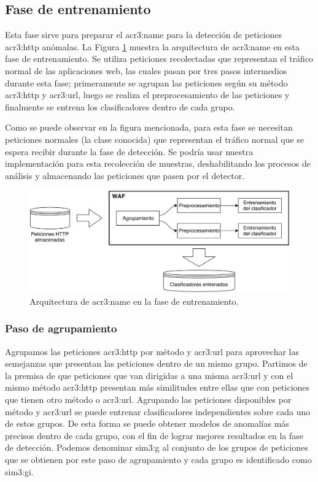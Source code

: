 \subsection{Fase de entrenamiento}

Esta fase sirve para preparar el \gls{acr3:name} para la detección de
peticiones \gls{acr3:http} anómalas. La Figura \ref{fig:waf:waf_diagram_training}
muestra la arquitectura de \gls{acr3:name} en esta fase de entrenamiento.
Se utiliza peticiones recolectadas que representan el tráfico normal de
las aplicaciones web, las cuales pasan por tres pasos intermedios durante
esta fase; primeramente se agrupan las peticiones según su método
\gls{acr3:http} y \gls{acr3:url}, luego se realiza el preprocesamiento
de las peticiones y finalmente se entrena los clasificadores dentro de
cada grupo.

Como se puede observar en la figura mencionada, para esta fase se necesitan
peticiones normales (la clase conocida) que representan el tráfico normal
que se espera recibir durante la fase de detección. Se podría usar nuestra
implementación para esta recolección de muestras, deshabilitando los
procesos de análisis y almacenando las peticiones que pasen por el detector.

\begin{figure}[ht]
    \centering
    \includegraphics[width=\linewidth]{images/waf-diagram-training.png}

    \caption{Arquitectura de \gls{acr3:name} en la fase de
        entrenamiento.}
    \label{fig:waf:waf_diagram_training}
\end{figure}


\subsubsection{Paso de agrupamiento}

Agrupamos las peticiones \gls{acr3:http} por método y \gls{acr3:url}
para aprovechar las semejanzas que presentan las peticiones dentro de
un mismo grupo. Partimos de la premisa de que peticiones que van dirigidas
a una misma \gls{acr3:url} y con el mismo método \gls{acr3:http} presentan
más similitudes entre ellas que con peticiones que tienen otro método o
\gls{acr3:url}. Agrupando las peticiones disponibles por método y
\gls{acr3:url} se puede entrenar clasificadores independientes sobre
cada uno de estos grupos. De esta forma se puede obtener modelos de
anomalías más precisos dentro de cada grupo, con el fin de lograr mejores
resultados en la fase de detección. Podemos denominar \gls{sim3:g} al
conjunto de los grupos de peticiones que se obtienen por este paso de
agrupamiento y cada grupo es identificado como \gls{sim3:gi}.


